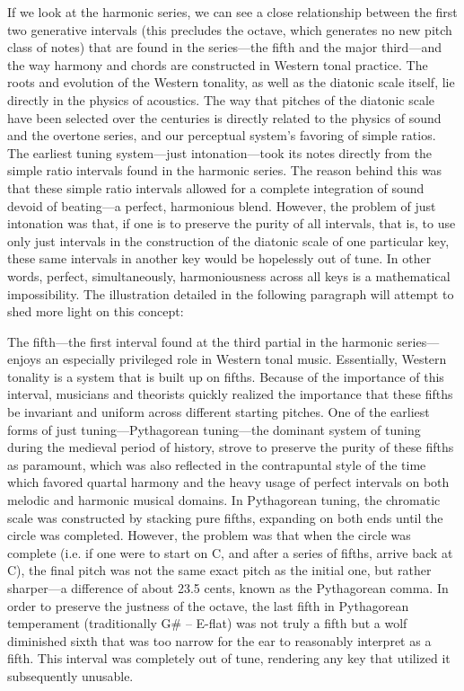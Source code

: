 If we look at the harmonic series, we can see a close relationship
between the first two generative intervals (this precludes the octave,
which generates no new pitch class of notes) that are found in the
series---the fifth and the major third---and the way harmony and chords
are constructed in Western tonal practice. The roots and evolution of
the Western tonality, as well as the diatonic scale itself, lie directly
in the physics of acoustics. The way that pitches of the diatonic scale
have been selected over the centuries is directly related to the physics
of sound and the overtone series, and our perceptual system's favoring
of simple ratios. The earliest tuning system---just intonation---took
its notes directly from the simple ratio intervals found in the harmonic
series. The reason behind this was that these simple ratio intervals
allowed for a complete integration of sound devoid of beating---a
perfect, harmonious blend. However, the problem of just intonation was
that, if one is to preserve the purity of all intervals, that is, to use
only just intervals in the construction of the diatonic scale of one
particular key, these same intervals in another key would be hopelessly
out of tune. In other words, perfect, simultaneously, harmoniousness
across all keys is a mathematical impossibility. The illustration
detailed in the following paragraph will attempt to shed more light on
this concept:

The fifth---the first interval found at the third partial in the
harmonic series---enjoys an especially privileged role in Western tonal
music. Essentially, Western tonality is a system that is built up on
fifths. Because of the importance of this interval, musicians and
theorists quickly realized the importance that these fifths be invariant
and uniform across different starting pitches. One of the earliest forms
of just tuning---Pythagorean tuning---the dominant system of
tuning during the medieval period of history, strove to preserve the
purity of these fifths as paramount, which was also reflected in the
contrapuntal style of the time which favored quartal harmony and the
heavy usage of perfect intervals on both melodic and harmonic musical
domains. In Pythagorean tuning, the chromatic scale was constructed by
stacking pure fifths, expanding on both ends until the circle was
completed. However, the problem was that when the circle was complete
(i.e. if one were to start on C, and after a series of fifths, arrive
back at C), the final pitch was not the same exact pitch as the initial
one, but rather sharper---a difference of about 23.5 cents, known as the
Pythagorean comma. In order to preserve the justness of the octave, the
last fifth in Pythagorean temperament (traditionally G\# -- E-flat) was
not truly a fifth but a wolf diminished sixth that was too narrow for
the ear to reasonably interpret as a fifth. This interval was completely
out of tune, rendering any key that utilized it subsequently unusable.

